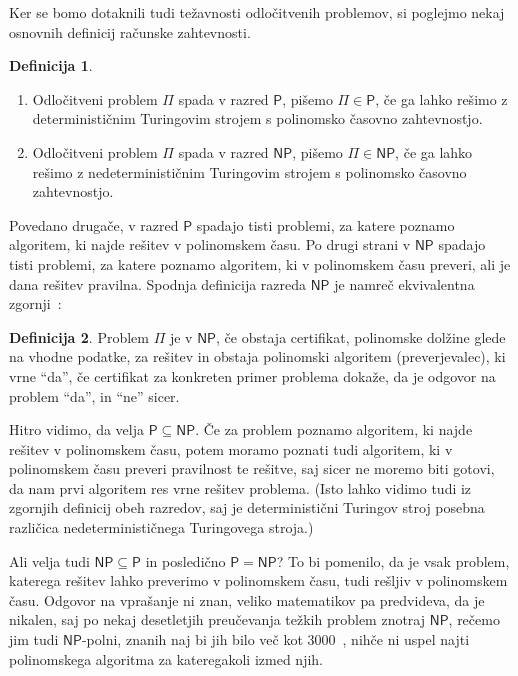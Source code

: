 \documentclass[12pt,a4paper,twoside]{article}
\theoremstyle{definition} %
\newtheorem{definicija}{Definicija}[section]
\theoremstyle{plain} %
\numberwithin{equation}{section}  %
\renewcommand{\P}{\ensuremath{\mathsf{P}}}
\newcommand{\NP}{\ensuremath{\mathsf{NP}}}
\begin{document}
Ker se bomo dotaknili tudi težavnosti odločitvenih problemov, si poglejmo nekaj osnovnih definicij računske zahtevnosti.
\begin{definicija}
    \begin{enumerate}
        \item Odločitveni problem $\Pi$ spada v razred \P, pišemo $\Pi \in \P$, če ga lahko rešimo z determinističnim Turingovim strojem s polinomsko časovno zahtevnostjo.
        \item Odločitveni problem $\Pi$ spada v razred \NP, pišemo $\Pi \in \NP$, če ga lahko rešimo z nedeterminističnim Turingovim strojem s polinomsko časovno zahtevnostjo.
    \end{enumerate}
\end{definicija}
Povedano drugače, v razred $\P$ spadajo tisti problemi, za katere poznamo algoritem, ki najde rešitev v polinomskem času. Po drugi strani v $\NP$ spadajo tisti problemi, za katere poznamo algoritem, ki v polinomskem času preveri, ali je dana rešitev pravilna. Spodnja definicija razreda $\NP$ je namreč ekvivalentna zgornji~\cite[izrek 7.20]{sipser2006complexity}:
\begin{definicija}
    Problem $\Pi$ je v $\NP$, če obstaja certifikat, polinomske dolžine glede na vhodne podatke, za rešitev in obstaja polinomski algoritem (preverjevalec), ki vrne ``da'', če certifikat za konkreten primer problema dokaže, da je odgovor na problem ``da'', in ``ne'' sicer.
\end{definicija}

Hitro vidimo, da velja $\P \subseteq \NP$. Če za problem poznamo algoritem, ki najde rešitev v polinomskem času, potem moramo poznati tudi algoritem, ki v polinomskem času preveri pravilnost te rešitve, saj sicer ne moremo biti gotovi, da nam prvi algoritem res vrne rešitev problema. (Isto lahko vidimo tudi iz zgornjih definicij obeh razredov, saj je deterministični Turingov stroj posebna različica nedeterminističnega Turingovega stroja.)

Ali velja tudi $\NP \subseteq \P$ in posledično $\P = \NP$? To bi pomenilo, da je vsak problem, katerega rešitev lahko preverimo v polinomskem času, tudi rešljiv v polinomskem času. Odgovor na vprašanje ni znan, veliko matematikov pa predvideva, da je nikalen, saj po nekaj desetletjih preučevanja težkih problem znotraj $\NP$, rečemo jim tudi $\NP$-polni, znanih naj bi jih bilo več kot 3000~\cite{wikiPvsNP}, nihče ni uspel najti polinomskega algoritma za kateregakoli izmed njih.
\end{document}
